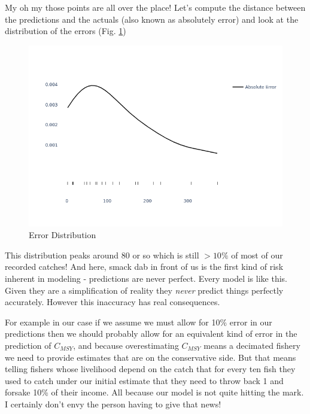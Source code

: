 \documentclass[11pt,a5paper]{book}
\begin{document}
My oh my those points are all over the place! Let's compute the distance between the predictions and the actuals (also known as absolutely error) and look at the distribution of the errors (Fig. \ref{fig:predictions_surplus_dist})
\newline

\begin{figure}[h!] 
  \includegraphics[width=\linewidth]{notebooks/SurplusModels/model_dist.png}
  \caption{Error Distribution}
  \label{fig:predictions_surplus_dist}
\end{figure}

This distribution peaks around 80 or so which is still $>10\%$ of most of our recorded catches! And here, smack dab in front of us is the first kind of risk inherent in modeling - predictions are never perfect. Every model is like this. Given they are a simplification of reality they \textit{never} predict things perfectly accurately. However this inaccuracy has real consequences. 
\newline

For example in our case if we assume we must allow for 10\% error in our predictions then we should probably allow for an equivalent kind of error in the prediction of $C_{MSY}$, and because overestimating $C_{MSY}$ means a decimated fishery we need to provide estimates that are on the conservative side. But that means telling fishers whose livelihood depend on the catch that for every ten fish they used to catch under our initial estimate that they need to throw back 1 and forsake 10\% of their income. All because our model is not quite hitting the mark. I certainly don't envy the person having to give that news! 
\newline
\end{document}

